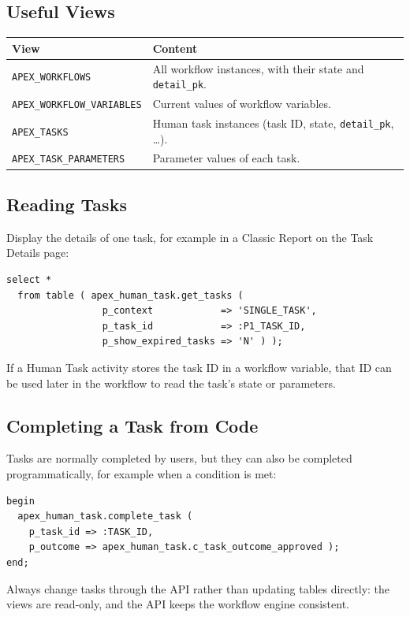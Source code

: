 \documentclass[11pt,a4paper]{article}
\begin{document}
\subsection{Useful Views}
\begin{center}\small
\begin{tabularx}{0.9\textwidth}{@{}lL@{}}
\toprule
\sffamily\bfseries View & \sffamily\bfseries Content \\
\midrule
\texttt{APEX\_WORKFLOWS} & All workflow instances, with their state and \texttt{detail\_pk}. \\
\texttt{APEX\_WORKFLOW\_VARIABLES} & Current values of workflow variables. \\
\texttt{APEX\_TASKS} & Human task instances (task ID, state, \texttt{detail\_pk}, \dots). \\
\texttt{APEX\_TASK\_PARAMETERS} & Parameter values of each task. \\
\bottomrule
\end{tabularx}
\end{center}

\subsection{Reading Tasks}
Display the details of one task, for example in a Classic Report on the Task Details page:
\begin{lstlisting}
select *
  from table ( apex_human_task.get_tasks (
                 p_context            => 'SINGLE_TASK',
                 p_task_id            => :P1_TASK_ID,
                 p_show_expired_tasks => 'N' ) );
\end{lstlisting}
If a Human Task activity stores the task ID in a workflow variable, that ID can be used later in the workflow to read the task's state or parameters.

\subsection{Completing a Task from Code}
Tasks are normally completed by users, but they can also be completed programmatically, for example when a condition is met:
\begin{lstlisting}
begin
  apex_human_task.complete_task (
    p_task_id => :TASK_ID,
    p_outcome => apex_human_task.c_task_outcome_approved );
end;
\end{lstlisting}
Always change tasks through the API rather than updating tables directly: the views are read-only, and the API keeps the workflow engine consistent.
\end{document}
